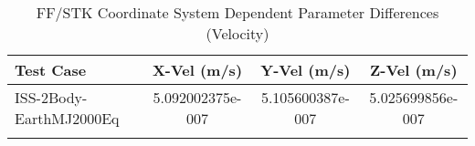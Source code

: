 \begin{table}[htbp!]
\centering
\caption{ FF/STK Coordinate System Dependent Parameter Differences (Velocity)}
      \begin{tabular}{lccc}
      \hline\hline
          Test Case & X-Vel (m/s) & Y-Vel (m/s) & Z-Vel (m/s) \\
         \hline
         ISS-2Body-EarthMJ2000Eq & 5.092002375e-007 & 5.105600387e-007 & 5.025699856e-007 \\
      \hline\hline
      \label{Table: FF-STK CS Parameters Set 2} 
\end{tabular}
\end{table}
